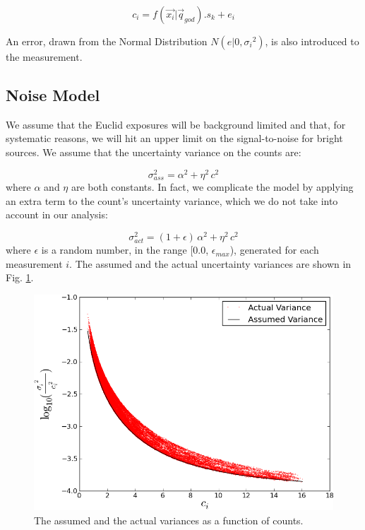 \documentclass[manuscript]{aastex}
\begin{document}
\begin{displaymath}
c_i = f(\vec{x_i} | \vec{q}_{god}) . s_{k} + e_{i}
\end{displaymath}

\noindent{}An error, drawn from the Normal Distribution $N(e|0,{\sigma_i}^2)$, is also introduced to the measurement.

\subsection{Noise Model}
We assume that the Euclid exposures will be background limited and that, for systematic reasons, we will hit an upper limit on the signal-to-noise for bright sources. We assume that the uncertainty variance on the counts are:

\begin{displaymath}
\sigma_{{ass}}^{2} = \alpha^{2} + \eta^{2}\, c^{2} 
\end{displaymath}
\noindent{}where $\alpha$ and $\eta$ are both constants. In fact, we complicate the model by applying an extra term to the count's uncertainty variance, which we do not take into account in our analysis: 

\begin{displaymath}
\sigma_{{act}}^{2} = (1 + \epsilon) \,\alpha^{2} + \eta^{2}\, c^{2} 
\end{displaymath}
\noindent{}where $\epsilon$ is a random number, in the range [0.0, $\epsilon_{max}$), generated for each measurement $i$. The assumed and the actual uncertainty variances are shown in Fig. \ref{fig:count_uncertainty}.

\begin{figure}[ht]
\begin{center}
\includegraphics[width=\textwidth]{invvar_plot.png}
\end{center}
\caption{The assumed and the actual variances as a function of counts.\label{fig:count_uncertainty}}
\end{figure}
\end{document}

